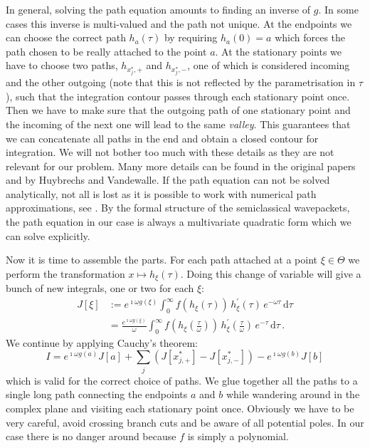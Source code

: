 \documentclass[a4paper,10pt]{article}
\begin{document}
In general, solving the path equation amounts to finding an inverse of $g$. In some cases
this inverse is multi-valued and the path not unique. At the endpoints we can
choose the correct path $h_a(\tau)$ by requiring $h_a(0) = a$ which forces the
path chosen to be really attached to the point $a$. At the stationary points we have
to choose two paths, $h_{x^{*}_j,+}$ and $h_{x^{*}_j,-}$, one of which is considered
incoming and the other outgoing (note that this is not reflected by the parametrisation
in $\tau$), such that the integration contour passes through each stationary point once.
Then we have to make sure that the outgoing path of one stationary point
and the incoming of the next one will lead to the same \emph{valley}. This guarantees
that we can concatenate all paths in the end and obtain a closed contour for integration.
We will not bother too much with these details as they are not relevant for our problem.
Many more details can be found in the original papers \cite{HV_hoq} and \cite{HV_cub} by
Huybrechs and Vandewalle. If the path equation can not be solved analytically, not
all is lost as it is possible to work with numerical path approximations, see \cite{AH_nsd_pa}.
By the formal structure of the semiclassical wavepackets, the path equation in our case is always
a multivariate quadratic form which we can solve explicitly.

Now it is time to assemble the parts. For each path attached at a point $\xi \in \Theta$
we perform the transformation $x \mapsto h_{\xi}(\tau)$. Doing this change of variable
will give a bunch of new integrals, one or two for each $\xi$:
\begin{equation} \label{eq:single_path_integral}
\begin{split}
  J[\xi] & := e^{\imath \omega g(\xi)}
              \int_{0}^{\infty}
                f(h_{\xi}(\tau)) \,
                h_{\xi}^{\prime}(\tau) \,
                e^{-\omega \tau} \,
              \mathrm{d}\tau \\
         & = \frac{e^{\imath \omega g(\xi)}}{\omega}
              \int_{0}^{\infty}
                f\left(h_{\xi}\left(\frac{\tau}{\omega}\right)\right) \,
                h_{\xi}^{\prime}\left(\frac{\tau}{\omega}\right) \,
                e^{-\tau} \,
              \mathrm{d}\tau \,.
\end{split}
\end{equation}
We continue by applying Cauchy's theorem:
\begin{equation} \label{eq:cauchy}
      I = e^{\imath \omega g(a)} J[a]
        + \sum_{j} \left(J[x_{j,+}^{*}] - J[x_{j,-}^{*}]\right)
        - e^{\imath \omega g(b)} J[b]
\end{equation}
which is valid for the correct choice of paths. We glue together all the paths
to a single long path connecting the endpoints $a$ and $b$ while wandering around
in the complex plane and visiting each stationary point once. Obviously we have to
be very careful, avoid crossing branch cuts and be aware of all potential poles.
In our case there is no danger around because $f$ is simply a polynomial.
\end{document}
